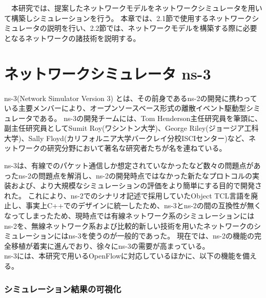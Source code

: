 \begin{comment}
QoE（Quality of Experience）とは，ユーザの満足レベルを定量的に示す指標である．この指標は，ネットワーク自体ではなくその上で提供されるIPTV等のアプリケーションサービスの体感品質のことである．たとえば，IPTVサービスの場合映像・音声の品質，チャンネルの切替え・早送り巻戻しなどのスムーズさ，その他使い勝手全般がQoEとなる．
QoS同様，QoEは評価項目を可能な限り数値指標として記述される．QoEは，ユーザ自身があるサービスについて評価を行い，その評価を数値として可視化したものがQoEとなる．QoSはネットワーク性能を，QoEはユーザーの体感品質をそれぞれ対象とする．つまり，QoS は通信事業者やサービス提供者から見たサービス品質の尺度であり，QoE はユーザーから見たサービス品質の尺度となる\cite{QoE}．
\end{comment}


　本研究では、提案したネットワークモデルをネットワークシミュレータを用いて構築しシミュレーションを行う。
本章では、2.1節で使用するネットワークシミュレータの説明を行い、2.2節では、ネットワークモデルを構築する際に必要となるネットワークの諸技術を説明する。

\section{ネットワークシミュレータ ns-3}

ns-3(Network Simulator Version 3)\cite{ns3} \cite{ns3text} とは、その前身であるns-2の開発に携わっている主要メンバーにより、オープンソースベース形式の離散イベント駆動型シミュレータである。
ns-3の開発チームには、Tom Henderson主任研究員を筆頭に、副主任研究員としてSumit Roy(ワシントン大学)、George Riley(ジョージア工科大学)、Sally Floyd(カリフォルニア大学バークレイ分校ISCIセンター)など、ネットワークの研究分野において著名な研究者たちが名を連ねている。

ns-3は、有線でのパケット通信しか想定されていなかったなど数々の問題点があったns-2の問題点を解消し、ns-2の開発時点ではなかった新たなプロトコルの実装および、より大規模なシミュレーションの評価をより簡単にする目的で開発された。
これにより、ns-2でのシナリオ記述で採用していたObject TCL言語を廃止し、事実上C++でのデザインに統一したため、ns-3とns-2の間の互換性が無くなってしまったため、現時点では有線ネットワーク系のシミュレーションにはns-2を、無線ネットワーク系および比較的新しい技術を用いたネットワークのシミュレーションにはns-3を使うのが一般的であった。
現在では、ns-2の機能の完全移植が着実に進んでおり、徐々にns-3の需要が高まっている。 \\

ns-3には、本研究で用いるOpenFlowに対応しているほかに、以下の機能を備える。

\subsubsection{シミュレーション結果の可視化}

